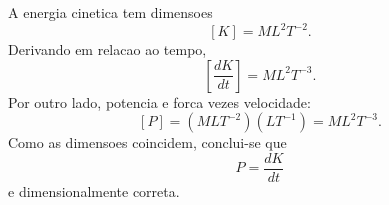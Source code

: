 A energia cinetica tem dimensoes
\[
[K] = M L^2 T^{-2}.
\]
Derivando em relacao ao tempo,
\[
\left[\frac{dK}{dt}\right] = M L^2 T^{-3}.
\]
Por outro lado, potencia e forca vezes velocidade:
\[
[P] = (M L T^{-2})(L T^{-1}) = M L^2 T^{-3}.
\]
Como as dimensoes coincidem, conclui-se que
\[
P = \frac{dK}{dt}
\]
e dimensionalmente correta.

